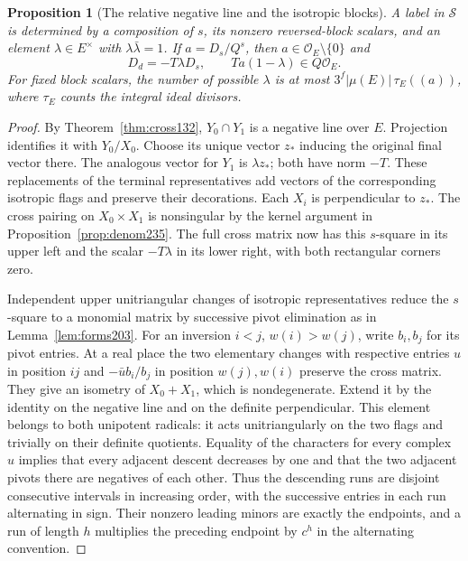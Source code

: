 \documentclass[a4paper,11pt]{article}
\newtheorem{proposition}{Proposition}[section]
\theoremstyle{definition}
\theoremstyle{remark}
\numberwithin{equation}{section}
\begin{document}
\begin{proposition}[The relative negative line and the isotropic blocks]
\leavevmode\label{prop:class236}
A label in \(\mathcal S\) is determined by a composition of
\(s\), its nonzero reversed-block scalars, and an element
\(\lambda\in E^\times\) with \(\lambda\bar\lambda=1\).
If \(a=D_s/Q^s\), then \(a\in\mathcal O_E\setminus\{0\}\) and
\[
         D_d=-T\lambda D_s,\qquad
         Ta(1-\lambda)\in Q\mathcal O_E .
\]
For fixed block scalars, the number of possible \(\lambda\) is
at most \(3^f|\mu(E)|\,\tau_E((a))\), where
\(\tau_E\) counts the integral ideal divisors.
\end{proposition}
\begin{proof}
By Theorem~\ref{thm:cross132}, \(Y_0\cap Y_1\) is a negative
line over \(E\). Projection identifies it with \(Y_0/X_0\).
Choose its unique vector \(z_*\) inducing the original final
vector there. The analogous vector for \(Y_1\) is
\(\lambda z_*\); both have norm \(-T\). These replacements
of the terminal representatives add vectors of the corresponding
isotropic flags and preserve their decorations. Each \(X_i\)
is perpendicular to \(z_*\). The cross pairing on
\(X_0\times X_1\) is nonsingular by the kernel argument in
Proposition~\ref{prop:denom235}. The full cross matrix now has
this \(s\)-square in its upper left and the scalar \(-T\lambda\)
in its lower right, with both rectangular corners zero.

Independent upper unitriangular changes of isotropic
representatives reduce the \(s\)-square to a monomial matrix
by successive pivot elimination as in Lemma~\ref{lem:forms203}.
For an inversion \(i<j\), \(w(i)>w(j)\), write \(b_i,b_j\)
for its pivot entries. At a real place the two elementary
changes with respective entries \(u\) in position \(ij\) and
\(-\bar u b_i/b_j\) in position \(w(j),w(i)\) preserve the
cross matrix. They give an isometry of \(X_0+X_1\), which is
nondegenerate. Extend it by the identity on the negative line
and on the definite perpendicular. This element belongs to both
unipotent radicals: it acts unitriangularly on the two flags
and trivially on their definite quotients. Equality of the
characters for every complex \(u\) implies that every adjacent
descent decreases by one and that the two adjacent pivots there
are negatives of each other. Thus the descending runs are
disjoint consecutive intervals in increasing order, with the
successive entries in each run alternating in sign. Their
nonzero leading minors are exactly the endpoints, and a run
of length \(h\) multiplies the preceding endpoint by \(c^h\)
in the alternating convention.


\end{proof}
\end{document}
